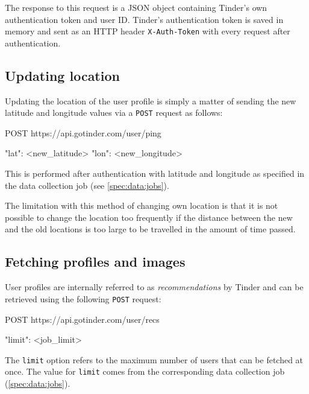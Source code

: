 The response to this request is a JSON object containing Tinder's own 
authentication token and user ID. Tinder's authentication token is saved in 
memory and sent as an HTTP header \texttt{X-Auth-Token} with every request 
after authentication.


\subsection{Updating location}
Updating the location of the user profile is simply a matter of sending the 
new latitude and longitude values via a \texttt{POST} request as follows:
\begin{logs}
POST https://api.gotinder.com/user/ping

{
    "lat": <new_latitude>
    "lon": <new_longitude>
}
\end{logs}
This is performed after authentication with latitude and longitude as 
specified in the data collection job (see \ref{spec:data:jobs}).

The limitation with this method of changing own location is that it is not 
possible to change the location too frequently if the distance between the new 
and the old locations is too large to be travelled in the amount of time 
passed.

\subsection{Fetching profiles and images}
User profiles are internally referred to as \textit{recommendations} by Tinder and 
can be retrieved using the following \texttt{POST} request:
\begin{logs}
POST https://api.gotinder.com/user/recs

{
    "limit": <job_limit>
}
\end{logs}
The \texttt{limit} option refers to the maximum number of users that can be 
fetched at once. The value for \texttt{limit} comes from the corresponding 
data collection job (\ref{spec:data:jobs}).

